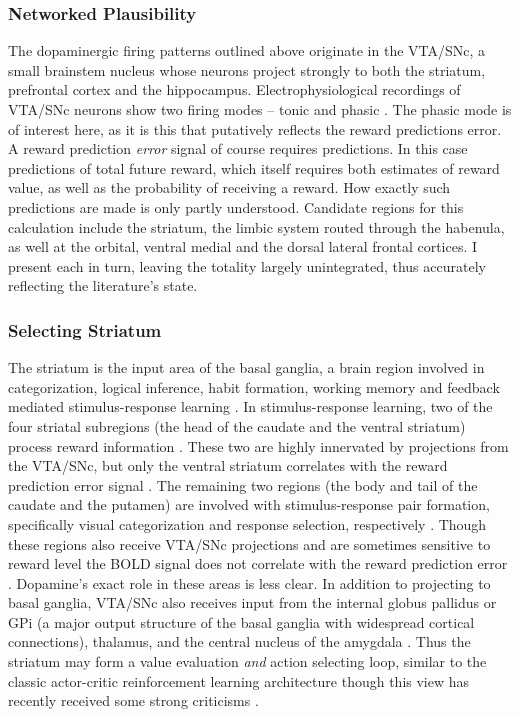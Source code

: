 \documentclass[doc,12pt]{apa}        %
\begin{document}
\subsubsection{Networked Plausibility}
\label{subsub:plausibility}
The dopaminergic firing patterns outlined above originate in the VTA/SNc, a small brainstem nucleus whose neurons project strongly to both the striatum, prefrontal cortex and the hippocampus.  Electrophysiological recordings of VTA/SNc neurons show two firing modes -- tonic and phasic \cite{DawNW:2006p6343}.  The phasic mode is of interest here, as it is this that putatively reflects the reward predictions error. A reward prediction \emph{error} signal of course requires predictions.  In this case predictions of total future reward, which itself requires both estimates of reward value, as well as the probability of receiving a reward.  How exactly such predictions are made is only partly understood.  Candidate regions for this calculation include the striatum, the limbic system routed through the habenula, as well at the orbital, ventral medial and the dorsal lateral frontal cortices.  I present each in turn, leaving the totality largely unintegrated, thus accurately reflecting the literature's state.

\subsubsection{Selecting Striatum}
\label{subsub:selstr}
The striatum is the input area of the basal ganglia, a brain region involved in categorization, logical inference, habit formation, working memory and feedback mediated stimulus-response learning \cite{Frank:2001p1996,Jin:2010p7199,SchmitzerTorbert:2004p5410,Seger:2008p6401,Seger:2010p7189,Yin:2006p5080}.  In stimulus-response learning, two of the four striatal subregions (the head of the caudate and the ventral striatum) process reward information \cite{Yin:2005p5101,Yin:2008p6347,Schonberg:2009p6669}.  These two are highly innervated by projections from the VTA/SNc, but only the ventral striatum correlates with the reward prediction error signal \cite{Haruno:2006p3979,Seger:2010p7189}.  The remaining two regions (the body and tail of the caudate and the putamen) are involved with stimulus-response pair formation, specifically visual categorization and response selection, respectively \cite{Seger:2008p6401,Seger:2010p7189}.  Though these regions also receive VTA/SNc projections and are sometimes sensitive to reward level \cite{BischoffGrethe:2009p4570} the BOLD signal does not correlate with the reward prediction error \cite{Seger:2010p7189}.  Dopamine's exact role in these areas is less clear.  In addition to projecting to basal ganglia, VTA/SNc also receives input from the internal globus pallidus or GPi (a major output structure of the basal ganglia with widespread cortical connections), thalamus, and the central nucleus of the amygdala \cite{Botvinick:2008p6594}.   Thus the striatum may form a value evaluation \emph{and} action selecting loop, similar to the classic actor-critic reinforcement learning architecture \cite{Bornstein:2011p7996,Ito:2011p8146} though this view has recently received some strong criticisms \cite{Joel:2002p6593}.
\end{document}
